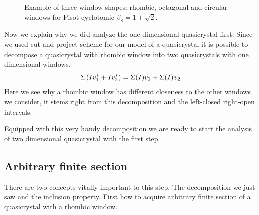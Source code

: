 \documentclass[text.tex]{subfiles}
\begin{document}
\begin{figure}[h!]
\centering
{}
\caption{Example of three window shapes: rhombic, octagonal and circular windows for Pisot-cyclotomic $\beta_8=1+\sqrt{2}$.}
\end{figure}

Now we explain why we did analyze the one dimensional quasicrystal first. Since we used cut-and-project scheme for our model of a quasicrystal it is possible to decompose a quasicrystal with rhombic window into two quasicrystals with one dimensional windows. 
$$\Sigma(Iv_1^\ast+Iv_2^\ast) = \Sigma(I)v_1+\Sigma(I)v_2$$
Here we see why a rhombic window has different closeness to the other windows we consider, it stems right from this decomposition and the left-closed right-open intervals.

Equipped with this very handy decomposition we are ready to start the analysis of two dimensional quasicrystal with the first step. 

\subsection{Arbitrary finite section}
There are two concepts vitally important to this step. The decomposition we just saw and the inclusion property. First how to acquire arbitrary finite section of a quasicrystal with a rhombic window. 
\end{document}
